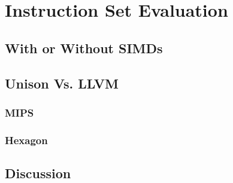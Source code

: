 %

\chapter{Instruction Set Evaluation}

\section{With or Without SIMDs}
\section{Unison Vs. LLVM}
\subsection{MIPS}
\subsection{Hexagon}
\section{Discussion}
